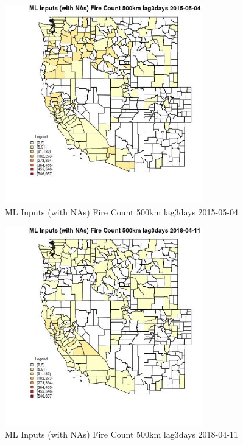 \begin{figure} 
\centering  
\includegraphics[width=0.77\textwidth]{Code_Outputs/Report_ML_input_PM25_Step4_part_e_de_duplicated_aves_compiled_2019-05-18wNAs_CountyFire_Count_500km_lag3daysMean2015-05-04.jpg} 
\caption{\label{fig:Report_ML_input_PM25_Step4_part_e_de_duplicated_aves_compiled_2019-05-18wNAsCountyFire_Count_500km_lag3daysMean2015-05-04}ML Inputs (with NAs) Fire Count 500km lag3days 2015-05-04} 
\end{figure} 
 

\begin{figure} 
\centering  
\includegraphics[width=0.77\textwidth]{Code_Outputs/Report_ML_input_PM25_Step4_part_e_de_duplicated_aves_compiled_2019-05-18wNAs_CountyFire_Count_500km_lag3daysMean2018-04-11.jpg} 
\caption{\label{fig:Report_ML_input_PM25_Step4_part_e_de_duplicated_aves_compiled_2019-05-18wNAsCountyFire_Count_500km_lag3daysMean2018-04-11}ML Inputs (with NAs) Fire Count 500km lag3days 2018-04-11} 
\end{figure} 
 

